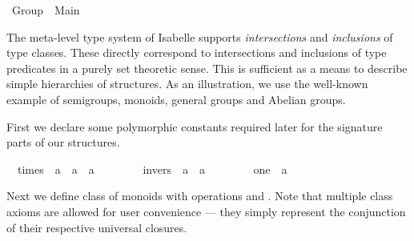 %
\begin{isabellebody}%
\def\isabellecontext{Group}%
%
\isamarkuptrue%
%
\isadelimtheory
%
\endisadelimtheory
%
\isatagtheory
{}\isamarkupfalse%
\ Group\ \ Main\ %
\endisatagtheory
{\isafoldtheory}%
%
\isadelimtheory
%
\endisadelimtheory
%
\begin{isamarkuptext}%
\medskip\noindent The meta-level type system of Isabelle supports
  \emph{intersections} and \emph{inclusions} of type classes. These
  directly correspond to intersections and inclusions of type
  predicates in a purely set theoretic sense. This is sufficient as a
  means to describe simple hierarchies of structures.  As an
  illustration, we use the well-known example of semigroups, monoids,
  general groups and Abelian groups.%
\end{isamarkuptext}%
\isamarkuptrue%
%
\isamarkuptrue%
%
\begin{isamarkuptext}%
First we declare some polymorphic constants required later for the
  signature parts of our structures.%
\end{isamarkuptext}%
\isamarkuptrue%
\isamarkupfalse%
\isanewline
\ \ times\ {\isacharcolon}{\isacharcolon}\ {\isachardoublequoteopen}{\isacharprime}a\ {\isasymRightarrow}\ {\isacharprime}a\ {\isasymRightarrow}\ {\isacharprime}a{\isachardoublequoteclose}\ \ \ \ {\isacharparenleft}\ {\isachardoublequoteopen}{\isasymodot}{\isachardoublequoteclose}\ {}{}{\isacharparenright}\isanewline
\ \ invers\ {\isacharcolon}{\isacharcolon}\ {\isachardoublequoteopen}{\isacharprime}a\ {\isasymRightarrow}\ {\isacharprime}a{\isachardoublequoteclose}\ \ \ \ {\isacharparenleft}{\isachardoublequoteopen}{\isacharparenleft}{\isacharunderscore}{\isasyminv}{\isacharparenright}{\isachardoublequoteclose}\ {\isacharbrackleft}{}{}{}{}{\isacharbrackright}\ {}{}{}{\isacharparenright}\isanewline
\ \ one\ {\isacharcolon}{\isacharcolon}\ {\isacharprime}a\ \ \ \ {\isacharparenleft}{\isachardoublequoteopen}{\isasymone}{\isachardoublequoteclose}{\isacharparenright}%
\begin{isamarkuptext}%
\noindent Next we define class  of monoids with
  operations \isa{{\isasymodot}} and \isa{{\isasymone}}.  Note that multiple class
  axioms are allowed for user convenience --- they simply represent
  the conjunction of their respective universal closures.%

\end{isamarkuptext}
\end{isabellebody}
